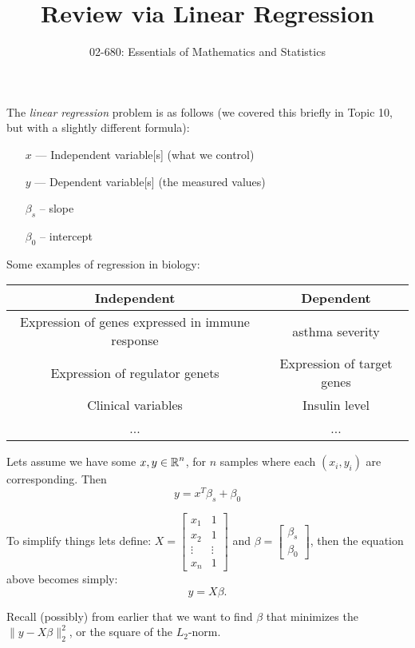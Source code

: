 

\title{Review via Linear Regression}
\author{02-680: Essentials of Mathematics and Statistics}


\maketitle

The \emph{linear regression} problem is as follows 
(we covered this briefly in Topic 10, but with a slightly different formula):
\begin{itemize}
\item[\textbf{$x$}] --- Independent variable[s] (what we control)
\item[\textbf{$y$}] --- Dependent variable[s] (the measured values)
\item[\textbf{$\beta_s$}] -- slope
\item[\textbf{$\beta_0$}] -- intercept
\end{itemize} 


Some examples of regression in biology:
\begin{center}\begin{tabular}{|c|c|}
\hline
Independent & Dependent\\
\hline\hline
Expression of genes expressed in immune response & asthma severity\\
\hline
Expression of regulator genets & Expression of target genes\\
\hline
Clinical variables & Insulin level\\
\hline
... & ...
\end{tabular}\end{center}

Lets assume we have some $x,y\in\operatorname{\mathbb{R}}^n$, for $n$ samples where each $(x_i,y_i)$ are corresponding. 
Then \[y = x^T\beta_s + \beta_0\]

To simplify things lets define:
$X = \begin{bmatrix} x_1 & 1\\x_2 & 1\\\vdots & \vdots\\x_n & 1\end{bmatrix}$ and $\beta = \begin{bmatrix}\beta_s\\\beta_0\end{bmatrix}$, 
then the equation above becomes simply:
\[y = X\beta.\]

Recall (possibly) from earlier that we want to find $\beta$ that minimizes the $\|y-X\beta\|^2_2$, 
or the square of the $L_2$-norm. 

